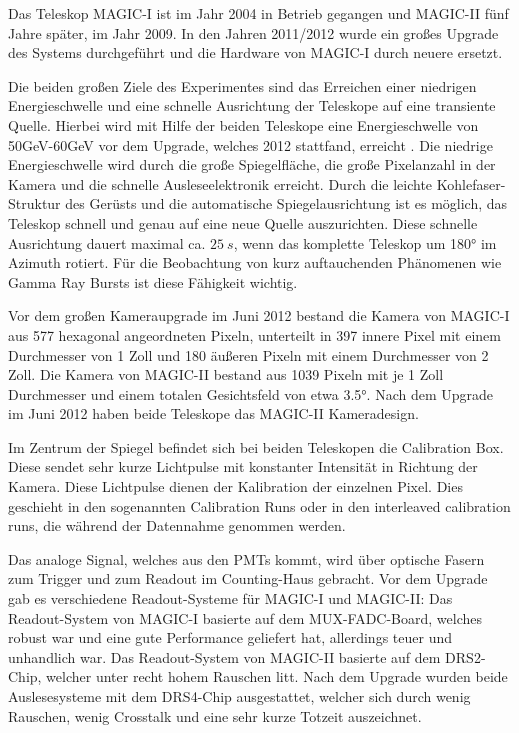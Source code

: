 Das Teleskop MAGIC-I ist im Jahr 2004 in Betrieb gegangen und MAGIC-II fünf Jahre später, im Jahr 2009.
In den Jahren 2011/2012 wurde ein großes Upgrade des Systems durchgeführt und die Hardware von MAGIC-I durch neuere ersetzt.

Die beiden großen Ziele des Experimentes sind das Erreichen einer niedrigen Energieschwelle und eine schnelle Ausrichtung der Teleskope auf eine transiente Quelle.
Hierbei wird mit Hilfe der beiden Teleskope eine Energieschwelle von 50GeV-60GeV vor dem Upgrade, welches 2012 stattfand, erreicht \cite{MAGIC_Telescopes}.
Die niedrige Energieschwelle wird durch die große Spiegelfläche, die große Pixelanzahl in der Kamera und die schnelle Ausleseelektronik erreicht.
Durch die leichte Kohlefaser-Struktur des Gerüsts und die automatische Spiegelausrichtung ist es möglich, das Teleskop schnell und genau auf eine neue Quelle auszurichten.
Diese schnelle Ausrichtung dauert maximal ca. $\SI{25}{s}$, wenn das komplette Teleskop um 180° im Azimuth rotiert.
Für die Beobachtung von kurz auftauchenden Phänomenen wie Gamma Ray Bursts ist diese Fähigkeit wichtig. 

Vor dem großen Kameraupgrade im Juni 2012 bestand die Kamera von MAGIC-I aus 577 hexagonal angeordneten Pixeln, unterteilt in 397 innere Pixel mit einem Durchmesser von 1 Zoll und 180 äußeren Pixeln mit einem Durchmesser von 2 Zoll.
Die Kamera von MAGIC-II bestand aus 1039 Pixeln mit je 1 Zoll Durchmesser und einem totalen Gesichtsfeld von etwa 3.5°.
Nach dem Upgrade im Juni 2012 haben beide Teleskope das MAGIC-II Kameradesign. \cite{MAGIC-Upgrade}

Im Zentrum der Spiegel befindet sich bei beiden Teleskopen die Calibration Box.
Diese sendet sehr kurze Lichtpulse mit konstanter Intensität in Richtung der Kamera.
Diese Lichtpulse dienen der Kalibration der einzelnen Pixel.
Dies geschieht in den sogenannten Calibration Runs oder in den interleaved calibration runs, die während der Datennahme genommen werden.

Das analoge Signal, welches aus den PMTs kommt, wird über optische Fasern zum Trigger und zum Readout im Counting-Haus gebracht.
Vor dem Upgrade gab es verschiedene Readout-Systeme für MAGIC-I und MAGIC-II:
Das Readout-System von MAGIC-I basierte auf dem MUX-FADC-Board, welches robust war und eine gute Performance geliefert hat, allerdings teuer und unhandlich war.
Das Readout-System von MAGIC-II basierte auf dem DRS2-Chip, welcher unter recht hohem Rauschen litt.
Nach dem Upgrade wurden beide Auslesesysteme mit dem DRS4-Chip ausgestattet, welcher sich durch wenig Rauschen, wenig Crosstalk und eine sehr kurze Totzeit auszeichnet.\cite{MAGIC-Upgrade}

